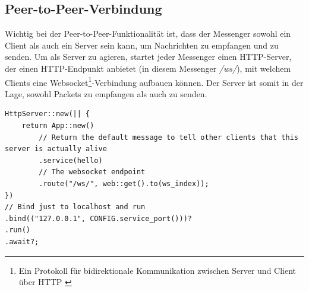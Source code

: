 \documentclass[a4paper,ngerman, headheight=28pt,12pt]{scrartcl}
\newcommand{\vcite}[1]{\cite[vgl.][]{#1}}
\begin{document}
\subsection{Peer-to-Peer-Verbindung}
Wichtig bei der Peer-to-Peer-Funktionalität ist, dass der Messenger sowohl ein Client als auch ein Server sein kann, um Nachrichten zu empfangen und zu senden.
Um als Server zu agieren, startet jeder Messenger einen HTTP-Server, der einen HTTP-Endpunkt anbietet (in diesem Messenger \textit{/ws/}), mit welchem Clients eine Websocket\footnote{Ein Protokoll für bidirektionale Kommunikation zwischen Server und Client über HTTP \vcite{WebsocketDef}}-Verbindung aufbauen können. Der Server ist somit in der Lage, sowohl Packets zu empfangen als auch zu senden.
\begin{verbatim}
HttpServer::new(|| {
    return App::new()
        // Return the default message to tell other clients that this server is actually alive
        .service(hello)
        // The websocket endpoint
        .route("/ws/", web::get().to(ws_index));
})
// Bind just to localhost and run
.bind(("127.0.0.1", CONFIG.service_port()))?
.run()
.await?;
\end{verbatim}
\end{document}
